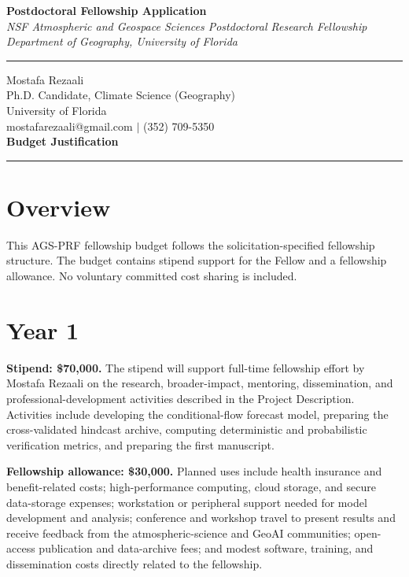 \documentclass[11pt,letterpaper]{article}
\begin{document}
\begin{center}
    \vspace*{-1.5cm}
    {\Large\bfseries Postdoctoral Fellowship Application} \\[0.2cm]
    {\small\textit{NSF Atmospheric and Geospace Sciences Postdoctoral Research Fellowship}} \\[0.05cm]
    {\small\textit{Department of Geography, University of Florida}} \\[0.1cm]
    \rule{0.6\textwidth}{0.4pt}
\end{center}
\vspace{-0.5cm}

\noindent
Mostafa Rezaali \\
Ph.D. Candidate, Climate Science (Geography) \\
University of Florida \\
mostafarezaali@gmail.com \quad $\mid$ \quad (352) 709-5350 \\[0.3cm]
{\large\bfseries Budget Justification}\\[-0.15cm]
\rule{\textwidth}{0.4pt}

\section*{Overview}
This AGS-PRF fellowship budget follows the solicitation-specified fellowship structure. The budget contains stipend support for the Fellow and a fellowship allowance. No voluntary committed cost sharing is included.

\section*{Year 1}
\textbf{Stipend: \$70,000.} The stipend will support full-time fellowship effort by Mostafa Rezaali on the research, broader-impact, mentoring, dissemination, and professional-development activities described in the Project Description. Activities include developing the conditional-flow forecast model, preparing the cross-validated hindcast archive, computing deterministic and probabilistic verification metrics, and preparing the first manuscript.

\textbf{Fellowship allowance: \$30,000.} Planned uses include health insurance and benefit-related costs; high-performance computing, cloud storage, and secure data-storage expenses; workstation or peripheral support needed for model development and analysis; conference and workshop travel to present results and receive feedback from the atmospheric-science and GeoAI communities; open-access publication and data-archive fees; and modest software, training, and dissemination costs directly related to the fellowship.
\end{document}
